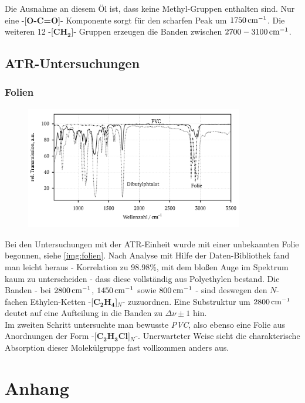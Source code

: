 \documentclass[numbers=noenddot,a4paper,10pt,twocolumn]{article}
\newcommand{\tilt}[1]{\textit{#1}}
\newcommand{\fett}[1]{\textbf{#1}}
\begin{document}
		Die Ausnahme an diesem \"Ol ist, dass keine Methyl-Gruppen enthalten sind. Nur eine -[\fett{O-C=O}]- Komponente sorgt f\"ur den scharfen Peak um $\unit[1750]{cm^{-1}}$. Die weiteren 12 -[\fett{CH}$_{\fett{2}}$]- Gruppen erzeugen die Banden zwischen $\unit[2700-3100]{cm^{-1}}$.
		
		\subsection{ATR-Untersuchungen}
		
		\subsubsection*{Folien}

			\begin{figure}
			\centering
				\includegraphics[width=0.85\textwidth]{Gruppe2A/folien.pdf}
				\caption{} 
				\label{img:folien}
			\end{figure}

		Bei den Untersuchungen mit der ATR-Einheit wurde mit einer unbekannten Folie begonnen, siehe \autoref{img:folien}. Nach Analyse mit Hilfe der Daten-Bibliothek fand man leicht heraus - Korrelation zu 98.98\%, mit dem blo{\ss}en Auge im Spektrum kaum zu unterscheiden - dass diese vollst\"andig aus Polyethylen bestand. Die Banden - bei $\unit[2800]{cm^{-1}}$, $\unit[1450]{cm^{-1}}$ sowie $\unit[800]{cm^{-1}}$ - sind deswegen den $N$-fachen Ethylen-Ketten -[\fett{C}$_{\fett{2}}$\fett{H}$_{\fett{4}}$]$_{N}$- zuzuordnen. Eine Substruktur um $\unit[2800]{cm^{-1}}$ deutet auf eine Aufteilung in die Banden zu $\Delta\nu\pm1$ hin.\\
		Im zweiten Schritt untersuchte man bewusste \tilt{PVC}, also ebenso eine Folie aus Anordnungen der Form -[\fett{C}$_{\fett{2}}$\fett{H}$_{\fett{3}}$\fett{Cl}]$_{N}$-. Unerwarteter Weise sieht die charakterische Absorption dieser Molek\"ulgruppe fast vollkommen anders aus. 

	\section{Anhang}

		
		
\end{document}
